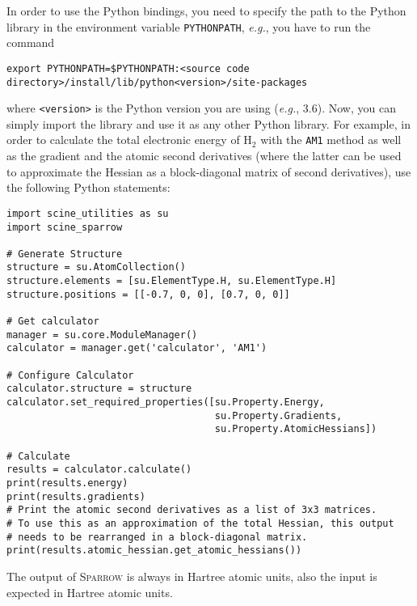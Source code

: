 \documentclass[]{tufte-book}
\begin{document}
In order to use the Python bindings, you need to specify the path to the Python library in the environment variable
\texttt{PYTHONPATH}, \textit{e.g.}, you have to run the command
\begin{verbatim}
export PYTHONPATH=$PYTHONPATH:<source code directory>/install/lib/python<version>/site-packages
\end{verbatim}
where \texttt{<version>} is the Python version you are using (\textit{e.g.}, 3.6). Now, you can simply import the library 
and use it as any other Python library. For example, in order to calculate the total electronic energy of H$_2$ with the 
\texttt{AM1} method as well as the gradient and the atomic second derivatives (where the latter can be used to approximate the Hessian as a block-diagonal matrix of second derivatives), use the following Python statements:
\begin{verbatim}
import scine_utilities as su
import scine_sparrow

# Generate Structure
structure = su.AtomCollection()
structure.elements = [su.ElementType.H, su.ElementType.H]
structure.positions = [[-0.7, 0, 0], [0.7, 0, 0]]

# Get calculator
manager = su.core.ModuleManager()
calculator = manager.get('calculator', 'AM1')

# Configure Calculator
calculator.structure = structure
calculator.set_required_properties([su.Property.Energy,
                                    su.Property.Gradients, 
                                    su.Property.AtomicHessians])

# Calculate
results = calculator.calculate()
print(results.energy)
print(results.gradients)
# Print the atomic second derivatives as a list of 3x3 matrices.
# To use this as an approximation of the total Hessian, this output
# needs to be rearranged in a block-diagonal matrix.
print(results.atomic_hessian.get_atomic_hessians())
\end{verbatim}
The output of \textsc{Sparrow} is always in Hartree atomic units, also the input is expected in Hartree atomic units.
\end{document}
